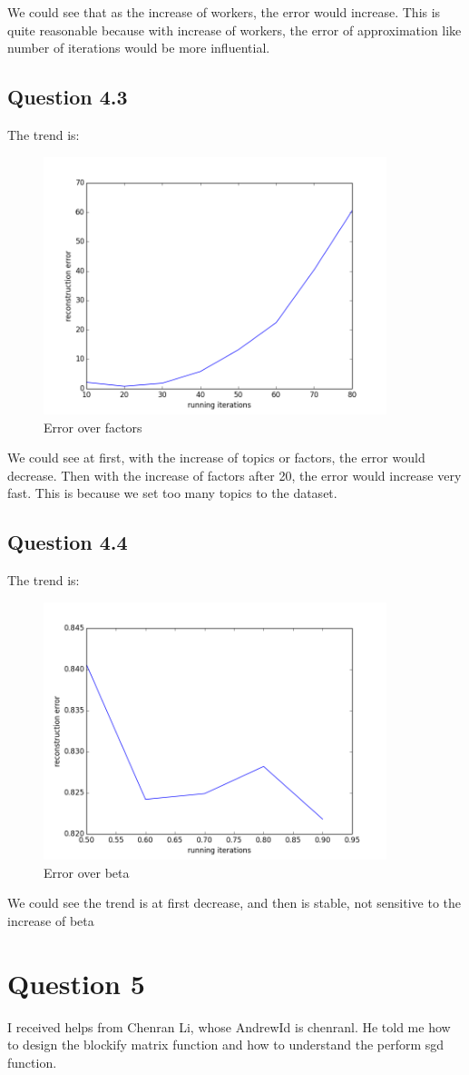 \documentclass{article} %
\begin{document}
We could see that as the increase of workers, the error would increase. This is
quite reasonable because with increase of workers, the error of approximation
like number of iterations would be more influential.

\subsection{Question 4.3}
The trend is:
\begin{figure}[h]
\begin{center}
\includegraphics[width=10cm]{pic/q43.png}
\end{center}
\caption{Error over factors}
\end{figure}

We could see at first, with the increase of topics or factors, the error would
decrease. Then with the increase of factors after 20, the error would increase
very fast. This is because we set too many topics to the dataset.

\subsection{Question 4.4}
The trend is:
\begin{figure}[h]
\begin{center}
\includegraphics[width=10cm]{pic/q44.png}
\end{center}
\caption{Error over beta}
\end{figure}

We could see the trend is at first decrease, and then is stable, not sensitive
to the increase of beta



\section{Question 5}

I received helps from Chenran Li, whose AndrewId is chenranl. He told me how to
design the blockify matrix function and how to understand the perform sgd
function.
\end{document}
